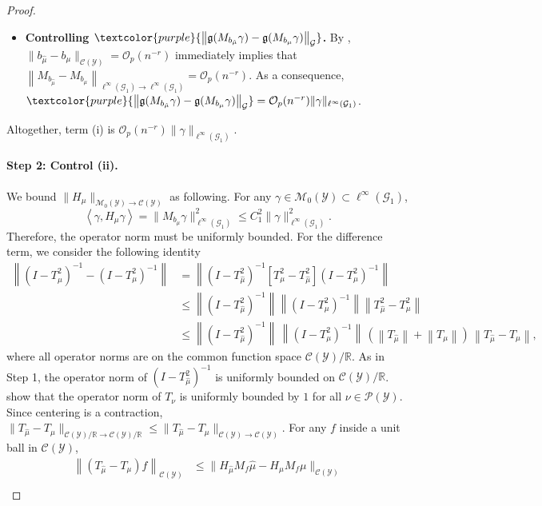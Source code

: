 \documentclass{article}
\theoremstyle{plain}
\theoremstyle{definition}
\theoremstyle{remark}
\newcommand{\R}{\mathbb{R}}
\newcommand{\of}[1]{\left(#1\right)}
\newcommand{\off}[1]{\left[#1\right]}
\newcommand{\cP}{\mathcal{P}}
\newcommand{\cG}{\mathcal{G}}
\newcommand{\cC}{\mathcal{C}}
\newcommand{\cO}{\mathcal{O}}
\newcommand{\cM}{\mathcal{M}}
\newcommand{\cY}{\mathcal{Y}}
\newcommand{\1}{\mathbbm{1}}
\newcommand{\iprod}[1]{\left\langle #1 \right\rangle}
\newcommand{\norm}[1]{\left \| #1 \right \|}
\theoremstyle{plain}
\theoremstyle{definition}
\begin{document}
\begin{proof}
\begin{itemize}
    \item \textbf{Controlling $\textcolor{purple}{\norm{\mathfrak{g}(M_{b_{\hat{\mu}}} \gamma) - \mathfrak{g}(M_{b_{{\mu}}} \gamma)}_{\cG}}$.} By \citet[Cor.~23]{kokot2025coreset}, $\|b_{\hat{\mu}} - b_\mu\|_{\cC(\cY)} = \cO_p(n^{-r})$ immediately implies that $\norm{M_{b_{\hat{\mu}}} - M_{b_{{\mu}}}}_{\ell^\infty(\cG_1) \to \ell^\infty(\cG_1)} = \cO_p(n^{-r})$.
    As a consequence, $\textcolor{purple}{\norm{\mathfrak{g}(M_{b_{\hat{\mu}}} \gamma) - \mathfrak{g}(M_{b_{{\mu}}} \gamma)}_{\cG}} = \cO_p(n^{-r}) \|\gamma\|_{\ell^\infty(\cG_1)}$.
    \end{itemize}
    Altogether, term (i) is $\cO_p(n^{-r}) \|\gamma\|_{\ell^\infty(\cG_1)}$.
    
    
    \paragraph{Step 2: Control (ii).} We bound $\| H_\mu\|_{\cM_0(\cY) \to \cC(\cY)}$ as following. For any $\gamma \in \cM_0(\cY) \subset \ell^\infty(\cG_1)$, 
    \[
    \iprod{\gamma, H_\mu \gamma} = \| M_{b_\mu} \gamma\|_{\ell^{\infty}(\cG_1)}^2 \leq C_1^2 \|\gamma\|_{\ell^\infty(\cG_1)}^2.
    \]
    Therefore, the operator norm must be uniformly bounded.
    For the difference term, we consider the following identity
    \begin{align*}
        \norm{(I - T_{\hat{\mu}}^2)^{-1} - (I - T_{{\mu}}^2)^{-1}} &=  \norm{(I - T_{\hat{\mu}}^2)^{-1} \off{T_\mu^2 - T_{\hat{\mu}}^2}(I - T_{{\mu}}^2)^{-1}}\\
        &\leq \norm{(I - T_{\hat{\mu}}^2)^{-1}} \norm{(I - T_{\mu}^2)^{-1}} \norm{T_{\hat{\mu}}^2 - T_\mu^2}\\
        &\leq \norm{(I - T_{\hat{\mu}}^2)^{-1}} \,\norm{(I - T_{\mu}^2)^{-1}} \, \of{\norm{T_{\hat{\mu}}} + \norm{T_\mu}} \, \norm{T_{\hat{\mu}} - T_\mu},
    \end{align*}
    where all operator norms are on the common function space $\cC(\cY)/\R$. As in Step 1, the operator norm of $(I - T_{\hat{\mu}}^2)^{-1}$ is uniformly bounded on $\cC(\cY) / \R$. \citet[Prop.~3.7]{lavenant2024riemannian} show that the operator norm of $T_\nu$ is uniformly bounded by $1$ for all $\nu \in \cP(\cY)$. Since centering is a contraction, $\|{ T_{\hat{\mu}} - T_\mu}\|_{\cC(\cY) / \R \to \cC(\cY) /\R} \leq \|T_{\hat{\mu}} - T_\mu\|_{\cC(\cY) \to \cC(\cY)}$. For any $f$ inside a unit ball in $\cC(\cY)$, 
    \begin{align*}
        \norm{(T_{\hat{\mu}} - T_\mu) f}_{\cC(\cY)} &\leq \| H_{\hat{\mu}} M_f \hat{\mu} - H_{{\mu}} M_f {\mu}\|_{\cC(\cY)}\\

\end{align*}
\end{proof}
\end{document}
